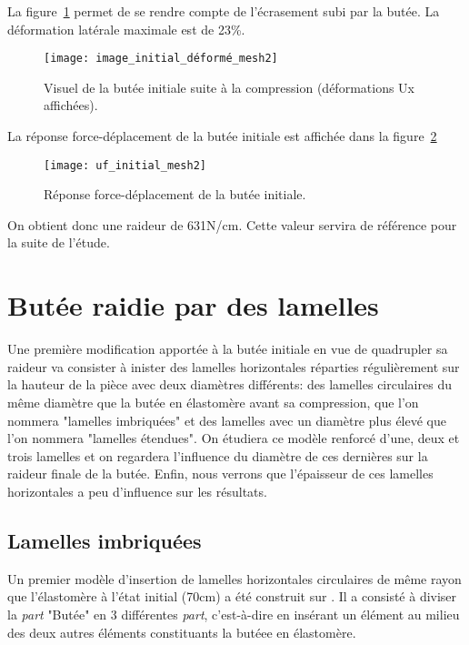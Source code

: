﻿ \documentclass{article}
\newcommand{\abaqus}{\bsc{Abaqus}\xspace}
\begin{document}
La figure~\ref{fig4} permet de se rendre compte de l'écrasement subi par la butée. La déformation latérale maximale est de 23\%.

\begin{figure}[!h]
	\centering
	\texttt{[image: image\_initial\_déformé\_mesh2]}
	\caption{Visuel de la butée initiale suite à la compression (déformations Ux affichées).}
	\label{fig4}
\end{figure}

La réponse force-déplacement de la butée initiale est affichée dans la figure~\ref{fig5}

\begin{figure}[!h]
	\centering
	\texttt{[image: uf\_initial\_mesh2]}
	\caption{Réponse force-déplacement de la butée initiale.}
	\label{fig5}
\end{figure}

On obtient donc une raideur de 631N/cm. Cette valeur servira de référence pour la suite de l'étude.


\section{Butée raidie par des lamelles}


Une première modification apportée à la butée initiale en vue de quadrupler sa raideur va consister à inister des lamelles horizontales réparties régulièrement sur la hauteur de la pièce avec deux diamètres différents: des lamelles circulaires du même diamètre que la butée en élastomère avant sa compression, que l'on nommera "lamelles imbriquées" et des lamelles avec un diamètre plus élevé que l'on nommera "lamelles étendues". On étudiera ce modèle renforcé d'une, deux et trois lamelles et on regardera l'influence du diamètre de ces dernières sur la raideur finale de la butée. Enfin, nous verrons que l'épaisseur de ces lamelles horizontales a peu d'influence sur les résultats.

\subsection{Lamelles imbriquées}

Un premier modèle d'insertion de lamelles horizontales circulaires de même rayon que l'élastomère à l'état initial (70cm) a été construit sur \abaqus. Il a consisté à diviser la \textit{part} "Butée" en 3 différentes \textit{part}, c'est-à-dire en insérant un élément au milieu des deux autres éléments constituants la butéee en élastomère.
\end{document}
